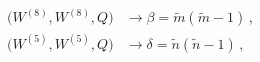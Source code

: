 \begin{equation}
\begin{aligned}
\big(W^{(8)}, W^{(8)}, Q\big) &\rightarrow \beta = \tilde m(\tilde m
-1)\, ,\\[1ex]
\big(W^{(5)}, W^{(5)}, Q\big) &\rightarrow \delta = \tilde n(\tilde n
-1 )\, ,
\end{aligned}
\end{equation}

